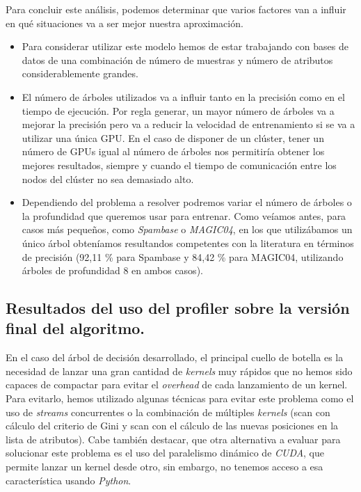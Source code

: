 Para concluir este análisis, podemos determinar que varios factores van a influir en qué situaciones va a ser mejor nuestra aproximación.
\begin{itemize}
\item Para considerar utilizar este modelo hemos de estar trabajando con bases de datos de una combinación de número de muestras y número de atributos considerablemente grandes.
\item El número de árboles utilizados va a influir tanto en la precisión como en el tiempo de ejecución. Por regla generar, un mayor número de árboles va a mejorar la precisión pero va a reducir la velocidad de entrenamiento si se va a utilizar una única GPU. En el caso de disponer de un clúster, tener un número de GPUs igual al número de árboles nos permitiría obtener los mejores resultados, siempre y cuando el tiempo de comunicación entre los nodos del clúster no sea demasiado alto.
\item Dependiendo del problema a resolver podremos variar el número de árboles o la profundidad que queremos usar para entrenar. Como veíamos antes, para casos más pequeños, como \textit{Spambase} o \textit{MAGIC04}, en los que utilizábamos un único árbol obteníamos resultandos competentes con la literatura en términos de precisión (92,11 \% para Spambase y 84,42 \% para MAGIC04, utilizando árboles de profundidad 8 en ambos casos).
\end{itemize}

\subsection{Resultados del uso del profiler sobre la versión final del algoritmo.}
En el caso del árbol de decisión desarrollado, el principal cuello de botella es la necesidad de lanzar una gran cantidad de \textit{kernels} muy rápidos que no hemos sido capaces de compactar para evitar el \textit{overhead} de cada lanzamiento de un kernel. Para evitarlo, hemos utilizado algunas técnicas para evitar este problema como el uso de \textit{streams} concurrentes o la combinación de múltiples \textit{kernels} (scan con cálculo del criterio de Gini y scan con el cálculo de las nuevas posiciones en la lista de atributos). Cabe también destacar, que otra alternativa a evaluar para solucionar este problema es el uso del paralelismo dinámico de \textit{CUDA}, que permite lanzar un kernel desde otro, sin embargo, no tenemos acceso a esa característica usando \textit{Python}.\\

